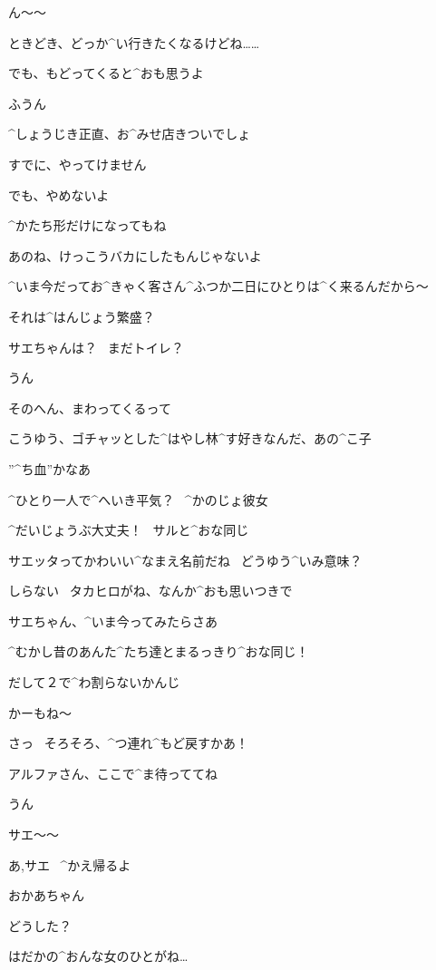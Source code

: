\Alpha ん〜〜

\Alpha ときどき、どっか^{い}{行}きたくなるけどね……

\Alpha でも、もどってくると^{おも}{思}うよ

\Makki ふうん

\page
\Makki ^{しょうじき}{正直}、お^{みせ}{店}きついでしょ

\Alpha すでに、やってけません

\Alpha でも、やめないよ

\Alpha ^{かたち}{形}だけになってもね

\Alpha あのね、けっこうバカにしたもんじゃないよ

\Alpha ^{いま}{今}だってお^{きゃく}{客}さん^{ふつか}{二日}にひとりは^{く}{来}るんだから〜

\Makki それは^{はんじょう}{繁盛}？

\page
\Alpha サエちゃんは？
\ まだトイレ？

\Makki うん

\Makki そのへん、まわってくるって

\Makki こうゆう、ゴチャッとした^{はやし}{林}^{す}{好}きなんだ、あの^{こ}{子}

\page
\Makki ”^{ち}{血}”かなあ

\Alpha ^{ひとり}{一人}で^{へいき}{平気}？
\ ^{かのじょ}{彼女}

\Makki ^{だいじょうぶ}{大丈夫}！
\ サルと^{おな}{同}じ

\Alpha サエッタってかわいい^{なまえ}{名前}だね
\ どうゆう^{いみ}{意味}？

\Makki しらない
\ タカヒロがね、なんか^{おも}{思}いつきで

\page
\Alpha サエちゃん、^{いま}{今}ってみたらさあ

\Alpha ^{むかし}{昔}のあんた^{たち}{達}とまるっきり^{おな}{同}じ！

\Alpha だして２で^{わ}{割}らないかんじ

\Makki かーもね〜

\page
\Makki さっ
\ そろそろ、^{つ}{連}れ^{もど}{戻}すかあ！

\Makki アルファさん、ここで^{ま}{待}っててね

\Alpha うん

\page[117]
\Makki サエ〜〜

\page
\Makki あ,サエ
\ ^{かえ}{帰}るよ

\Sae おかあちゃん

\Makki どうした？

\Sae はだかの^{おんな}{女}のひとがね…

